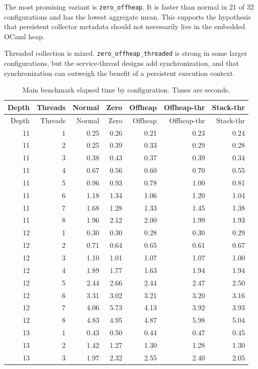 \documentclass[11pt,a4paper]{article}
\begin{document}
The most promising variant is \texttt{zero\_offheap}. It is faster than normal
in 21 of 32 configurations and has the lowest aggregate mean. This supports the
hypothesis that persistent collector metadata should not necessarily live in the
embedded OCaml heap.

Threaded collection is mixed. \texttt{zero\_offheap\_threaded} is strong in some
larger configurations, but the service-thread designs add synchronization, and
that synchronization can outweigh the benefit of a persistent execution context.

\begin{longtable}{rrrrrrr}
\caption{Main benchmark elapsed time by configuration. Times are seconds.}
\label{tab:detail}\\
\toprule
Depth & Threads & Normal & Zero & Offheap & Offheap-thr & Stack-thr \\
\midrule
\endfirsthead
\toprule
Depth & Threads & Normal & Zero & Offheap & Offheap-thr & Stack-thr \\
\midrule
\endhead
11 & 1 & 0.25 & 0.26 & 0.21 & 0.23 & 0.24 \\
11 & 2 & 0.25 & 0.39 & 0.33 & 0.29 & 0.28 \\
11 & 3 & 0.38 & 0.43 & 0.37 & 0.39 & 0.34 \\
11 & 4 & 0.67 & 0.56 & 0.60 & 0.70 & 0.55 \\
11 & 5 & 0.96 & 0.93 & 0.78 & 1.00 & 0.81 \\
11 & 6 & 1.18 & 1.34 & 1.06 & 1.20 & 1.04 \\
11 & 7 & 1.68 & 1.28 & 1.33 & 1.45 & 1.38 \\
11 & 8 & 1.96 & 2.12 & 2.00 & 1.99 & 1.93 \\
12 & 1 & 0.30 & 0.30 & 0.28 & 0.30 & 0.29 \\
12 & 2 & 0.71 & 0.64 & 0.65 & 0.61 & 0.67 \\
12 & 3 & 1.10 & 1.01 & 1.07 & 1.07 & 1.00 \\
12 & 4 & 1.89 & 1.77 & 1.63 & 1.94 & 1.94 \\
12 & 5 & 2.44 & 2.66 & 2.44 & 2.47 & 2.50 \\
12 & 6 & 3.31 & 3.02 & 3.21 & 3.20 & 3.16 \\
12 & 7 & 4.06 & 5.73 & 4.13 & 3.92 & 3.93 \\
12 & 8 & 4.83 & 4.95 & 4.87 & 5.98 & 5.04 \\
13 & 1 & 0.43 & 0.50 & 0.44 & 0.47 & 0.45 \\
13 & 2 & 1.42 & 1.27 & 1.30 & 1.28 & 1.30 \\
13 & 3 & 1.97 & 2.32 & 2.55 & 2.40 & 2.05 \\

\end{longtable}
\end{document}
